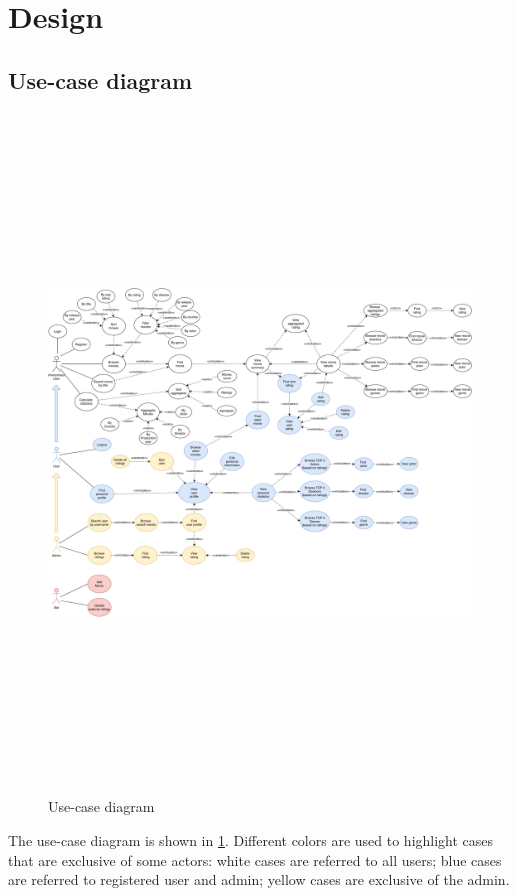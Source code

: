 \documentclass[11pt]{article}
\begin{document}
\section{Design}

\subsection{Use-case diagram}

\begin{figure}
    \centering
    \includegraphics[height=18cm]{figs/use_case.pdf}
    \caption{Use-case diagram}
    \label{fig:usecase}
\end{figure}

The use-case diagram is shown in \cref{fig:usecase}. Different colors are used to highlight cases that are exclusive of some actors: white cases are referred to all users; blue cases are referred to registered user and admin; yellow cases are exclusive of the admin.
\end{document}
